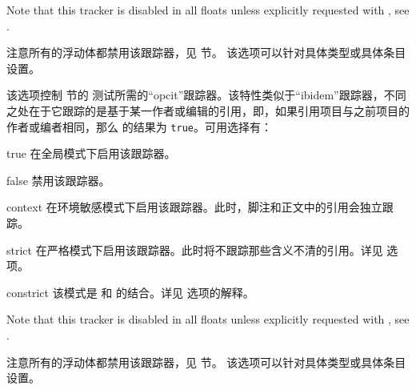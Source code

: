 \begin{optionlist}
Note that this tracker is disabled in all floats unless explicitly requested with , see .

注意所有的浮动体都禁用该跟踪器，见  节。
该选项可以针对具体类型或具体条目设置。


该选项控制  节的  测试所需的“opcit”跟踪器。该特性类似于“ibidem”跟踪器，不同之处在于它跟踪的是基于某一作者或编辑的引用，即，如果引用项目与之前项目的作者或编者相同，那么  的结果为 \texttt{true}。可用选择有：

\begin{valuelist}
\item[true] %
在全局模式下启用该跟踪器。
\item[false] %
禁用该跟踪器。
\item[context] %
在环境敏感模式下启用该跟踪器。此时，脚注和正文中的引用会独立跟踪。
\item[strict] %
在严格模式下启用该跟踪器。此时将不跟踪那些含义不清的引用。详见  选项。
\item[constrict] %
该模式是  和  的结合。详见   选项的解释。
\end{valuelist}

Note that this tracker is disabled in all floats unless explicitly requested with , see .

注意所有的浮动体都禁用该跟踪器，见  节。
该选项可以针对具体类型或具体条目设置。


\end{optionlist}
